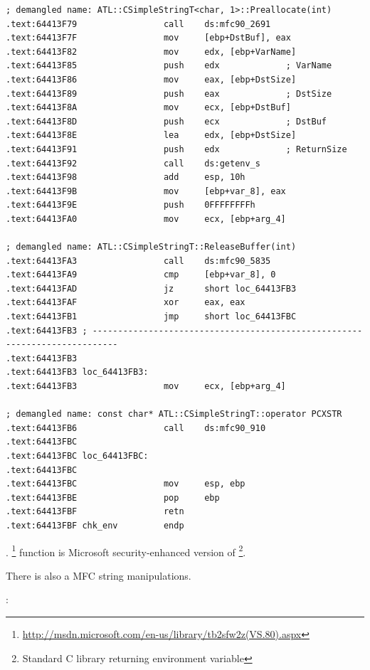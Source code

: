 \begin{lstlisting}
; demangled name: ATL::CSimpleStringT<char, 1>::Preallocate(int)
.text:64413F79                 call    ds:mfc90_2691
.text:64413F7F                 mov     [ebp+DstBuf], eax
.text:64413F82                 mov     edx, [ebp+VarName]
.text:64413F85                 push    edx             ; VarName
.text:64413F86                 mov     eax, [ebp+DstSize]
.text:64413F89                 push    eax             ; DstSize
.text:64413F8A                 mov     ecx, [ebp+DstBuf]
.text:64413F8D                 push    ecx             ; DstBuf
.text:64413F8E                 lea     edx, [ebp+DstSize]
.text:64413F91                 push    edx             ; ReturnSize
.text:64413F92                 call    ds:getenv_s
.text:64413F98                 add     esp, 10h
.text:64413F9B                 mov     [ebp+var_8], eax
.text:64413F9E                 push    0FFFFFFFFh
.text:64413FA0                 mov     ecx, [ebp+arg_4]

; demangled name: ATL::CSimpleStringT::ReleaseBuffer(int)
.text:64413FA3                 call    ds:mfc90_5835
.text:64413FA9                 cmp     [ebp+var_8], 0
.text:64413FAD                 jz      short loc_64413FB3
.text:64413FAF                 xor     eax, eax
.text:64413FB1                 jmp     short loc_64413FBC
.text:64413FB3 ; ---------------------------------------------------------------------------
.text:64413FB3
.text:64413FB3 loc_64413FB3:
.text:64413FB3                 mov     ecx, [ebp+arg_4]

; demangled name: const char* ATL::CSimpleStringT::operator PCXSTR 
.text:64413FB6                 call    ds:mfc90_910
.text:64413FBC
.text:64413FBC loc_64413FBC:
.text:64413FBC
.text:64413FBC                 mov     esp, ebp
.text:64413FBE                 pop     ebp
.text:64413FBF                 retn
.text:64413FBF chk_env         endp
\end{lstlisting}

.  \footnote{\url{http://msdn.microsoft.com/en-us/library/tb2sfw2z(VS.80).aspx}} 
{function is Microsoft security-enhanced version of \footnote{Standard C library returning environment variable}}.

{There is also a MFC string manipulations}.

:

